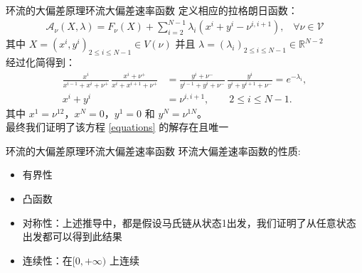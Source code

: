 \documentclass{beamer}
\begin{document}
\begin{frame}{环流的大偏差原理}{环流大偏差速率函数}
	定义相应的拉格朗日函数：
	\begin{align*}
		\mathcal{A}_{\nu}(X,\lambda) = F_{\nu}(X) + \sum_{i=2}^{N-1} \lambda_i \left(x^{i} + y^{i} - \nu^{i,i+1}\right), \;\;\;\forall \nu\in\mathcal{V}
	\end{align*}
	其中 $X=(x^i,y^i)_{2\le i\le N-1}\in V(\nu)$ 并且 $\lambda=(\lambda_i)_{2\le i\le N-1}\in \mathbb{R}^{N-2}$ \\
	经过化简得到：
	\begin{equation}\label{equations}
		\begin{split}
			\frac{x^{i}}{x^{i-1}+x^{i}+\nu^+}
			\,\frac{x^{i}+\nu^+}{x^{i}+x^{i+1}+\nu^+}
			&= \frac{y^{i}+\nu^-}{y^{i-1}+y^{i}+\nu^-}
			\,\frac{y^{i}}{y^{i}+y^{i+1}+\nu^-}=e^{-\lambda_i},\\
			x^{i} + y^{i} &= \nu^{i,i+1},\qquad 2\le i\le N-1.
		\end{split}
	\end{equation}
	其中 $x^1=\nu^{12}$，$x^N=0$，$y^1=0$ 和 $y^N=\nu^{1N}$。\\
	最终我们证明了该方程 \ref{equations} 的解存在且唯一
\end{frame}

\begin{frame}{环流的大偏差原理}{环流大偏差速率函数}
	环流大偏差速率函数的性质:
	\begin{itemize}
		\item 有界性
		\item 凸函数
		\item 对称性：上述推导中，都是假设马氏链从状态1出发，我们证明了从任意状态出发都可以得到此结果
		\item 连续性：在$[0, +\infty)$ 上连续
	\end{itemize}
\end{frame}
\end{document}
